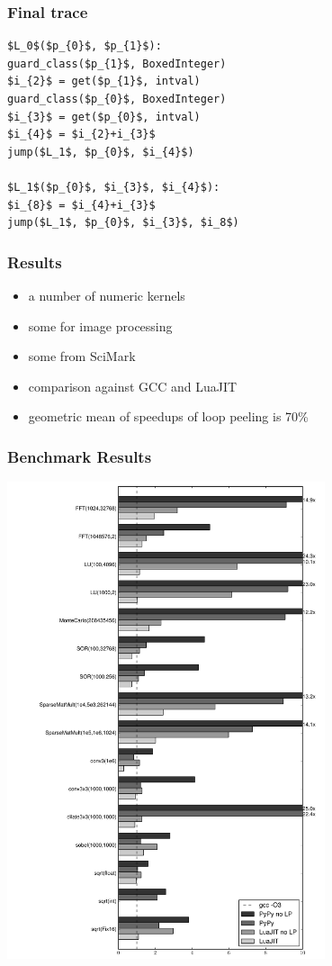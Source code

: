 \documentclass[utf8x]{beamer}
\begin{document}
\begin{frame}[fragile]
  \frametitle{Final trace}
\begin{lstlisting}[mathescape]
$L_0$($p_{0}$, $p_{1}$):
guard_class($p_{1}$, BoxedInteger)
$i_{2}$ = get($p_{1}$, intval)
guard_class($p_{0}$, BoxedInteger)
$i_{3}$ = get($p_{0}$, intval)
$i_{4}$ = $i_{2}+i_{3}$
jump($L_1$, $p_{0}$, $i_{4}$)

$L_1$($p_{0}$, $i_{3}$, $i_{4}$):
$i_{8}$ = $i_{4}+i_{3}$
jump($L_1$, $p_{0}$, $i_{3}$, $i_8$)
\end{lstlisting}
\end{frame}



\begin{frame}
  \frametitle{Results}
  \begin{itemize}
      \item a number of numeric kernels
      \item some for image processing
      \item some from SciMark
      \item comparison against GCC and LuaJIT
      \pause
      \item geometric mean of speedups of loop peeling is 70\%
  \end{itemize}
\end{frame}

\begin{frame}
  \frametitle{Benchmark Results}
  \includegraphics[width=0.7\textwidth,angle=90]{../benchmarks/result}
\end{frame}
\end{document}
